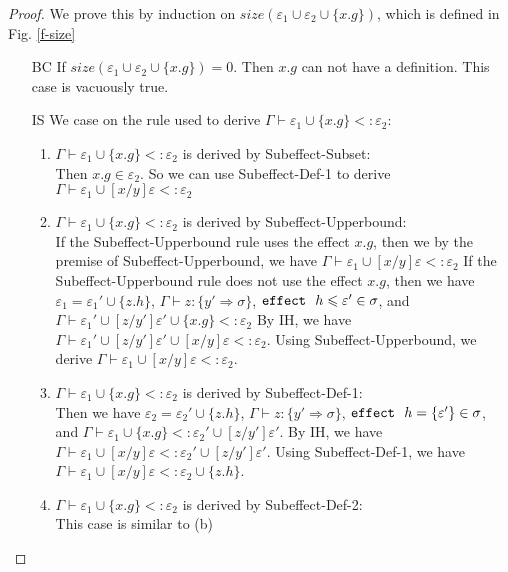\begin{proof}
We prove this by induction on $size(\varepsilon_1 \cup \varepsilon_2 \cup \{x.g\})$, which is defined in Fig. \ref{f-size}
\begin{enumerate}
    \item[BC] If $size(\varepsilon_1 \cup \varepsilon_2 \cup \{x.g\}) = 0$. Then $x.g$ can not have a definition. This case is vacuously true.
    \item[IS] We case on the rule used to derive  $\Gamma \vdash \varepsilon_1 \cup \{x.g\} <: \varepsilon_2$:
    \begin{enumerate}
        \item  $\Gamma \vdash \varepsilon_1 \cup \{x.g\} <: \varepsilon_2$ is derived by Subeffect-Subset:\\
        Then $x.g \in \varepsilon_2$. So we can use Subeffect-Def-1 to derive $\Gamma \vdash \varepsilon_1 \cup [x/y]\varepsilon <: \varepsilon_2$
        \item $\Gamma \vdash \varepsilon_1 \cup \{x.g\} <: \varepsilon_2$ is derived by Subeffect-Upperbound:\\
        If the Subeffect-Upperbound rule uses the effect $x.g$, then we by the premise of Subeffect-Upperbound, we have
        $\Gamma \vdash \varepsilon_1 \cup [x/y]\varepsilon <: \varepsilon_2$
        If the Subeffect-Upperbound rule does not use the effect $x.g$, then we have 
        $\varepsilon_1 = \varepsilon_1' \cup \{z.h\}$,
        $\Gamma \vdash z : \{y' \Rightarrow\sigma\}$,
        $\mathtt{effect}~\ h \leqslant \varepsilon' \in \sigma$,
        and 
        $\Gamma \vdash \varepsilon_1' \cup [z/y']\varepsilon' \cup \{x.g\} <: \varepsilon_2$
        By IH, we have
        $\Gamma \vdash \varepsilon_1' \cup [z/y']\varepsilon' \cup [x/y]\varepsilon <: \varepsilon_2$.
        Using Subeffect-Upperbound, we derive
        $\Gamma \vdash \varepsilon_1 \cup [x/y]\varepsilon <: \varepsilon_2$.
        \item $\Gamma \vdash \varepsilon_1 \cup \{x.g\} <: \varepsilon_2$ is derived by Subeffect-Def-1:\\
        Then we have 
        $\varepsilon_2 = \varepsilon_2' \cup \{z.h\}$,
        $\Gamma \vdash z : \{y' \Rightarrow\sigma\}$,
        $\mathtt{effect}~\ h = \{ \varepsilon'\} \in \sigma$,
        and 
        \mbox{$\Gamma \vdash \varepsilon_1 \cup \{x.g\} <: \varepsilon_2' \cup [z/y']\varepsilon'$}.
        By IH, we have
        \mbox{$\Gamma \vdash \varepsilon_1 \cup [x/y]\varepsilon <: \varepsilon_2' \cup [z/y']\varepsilon'$}.
        Using Subeffect-Def-1, we have
        $\Gamma \vdash \varepsilon_1 \cup [x/y]\varepsilon <: \varepsilon_2 \cup \{z.h\}$.
        \item $\Gamma \vdash \varepsilon_1 \cup \{x.g\} <: \varepsilon_2$ is derived by Subeffect-Def-2:\\ This case is similar to (b)
    \end{enumerate}
\end{enumerate}
\end{proof}





